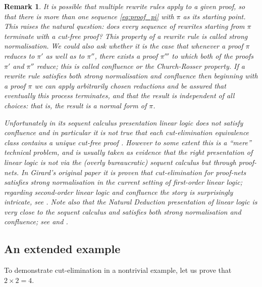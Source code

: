 \documentclass[english,letter paper,12pt,reqno]{article}
\theoremstyle{example}
\newtheorem{remark}[theorem]{Remark}
\begin{document}
\begin{remark} It is possible that multiple rewrite rules apply to a given proof, so that there is more than one sequence \eqref{eq:proof_pi} with $\pi$ as its starting point. This raises the natural question: does \emph{every} sequence of rewrites starting from $\pi$ terminate with a cut-free proof? This property of a rewrite rule is called \emph{strong normalisation}. We could also ask whether it is the case that whenever a proof $\pi$ reduces to $\pi'$ as well as to $\pi''$, there exists a proof $\pi'''$ to which both of the proofs $\pi'$ and $\pi''$ reduce; this is called \emph{confluence} or the \emph{Church-Rosser property}. If a rewrite rule satisfies both strong normalisation and confluence then beginning with a proof $\pi$ we can apply arbitrarily chosen reductions and be assured that eventually this process terminates, and that the result is independent of all choices: that is, the result is a \emph{normal form} of $\pi$.

Unfortunately in its sequent calculus presentation linear logic does \emph{not} satisfy confluence and in particular it is not true that each cut-elimination equivalence class contains a unique cut-free proof \cite[\S 1.3.1]{girard_prooftypes}. However to some extent this is a ``mere'' technical problem, and is usually taken as evidence that the right presentation of linear logic is not via the (overly bureaucratic) sequent calculus but through \emph{proof-nets}. In Girard's original paper \cite[III.3]{girard_llogic} it is proven that cut-elimination for proof-nets satisfies strong normalisation in the current setting of first-order linear logic; regarding second-order linear logic and confluence the story is surprisingly intricate, see \cite{pagani}. Note also that the Natural Deduction presentation of linear logic is very close to the sequent calculus and satisfies both strong normalisation and confluence; see \cite{benton_strong} and \cite[\S 2.2]{brauner}.
\end{remark}

\subsection{An extended example}

To demonstrate cut-elimination in a nontrivial example, let us prove that $2 \times 2 = 4$.
\end{document}
